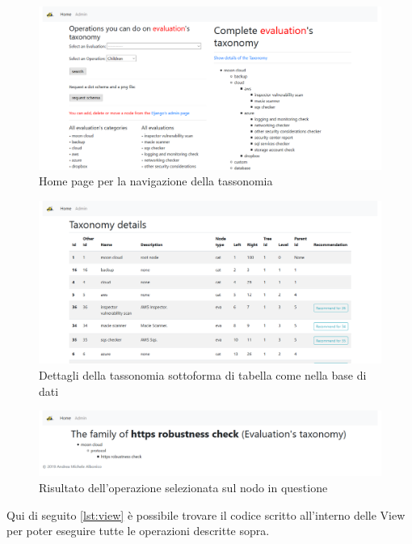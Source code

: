 \begin{figure}
	\includegraphics[scale=0.3]{images/MCRS_taxindex.png}
	\caption{Home page per la navigazione della tassonomia}
	\label{fig:MCRS_taxindex}
\end{figure}

\begin{figure}
	\includegraphics[scale=0.3]{images/MCRS_taxdetails.png}
	\caption{Dettagli della tassonomia sottoforma di tabella come nella base di dati}
	\label{fig:MCRS_taxdetails}
\end{figure}

\begin{figure}
	\includegraphics[scale=0.3]{images/MCRS_taxnodedetails.png}
	\caption{Risultato dell'operazione selezionata sul nodo in questione}
	\label{fig:MCRS_taxnodedetails}
\end{figure}

\newpage

Qui di seguito \ref{lst:view} è possibile trovare il codice scritto all'interno delle View per poter eseguire tutte le 
operazioni descritte sopra.


